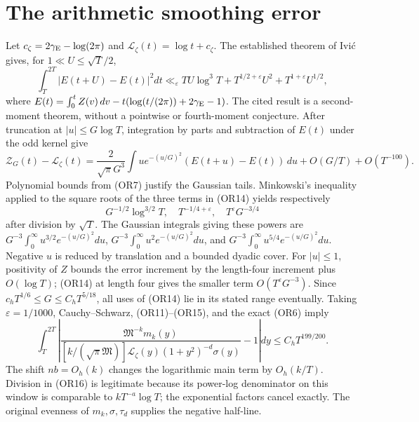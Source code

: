 \documentclass[11pt]{article}
\newcommand{\MM}{\mathfrak M}
\begin{document}
\section{The arithmetic smoothing error}
Let \(c_\zeta=2\gamma_{\rm E}-\log(2\pi)\) and
\(\mathcal L_\zeta(t)=\log t+c_\zeta\).  The established theorem
of Ivi\'c \cite[Section 2, (2.1) and its stated \(E\)-analogue]{Ivic}
gives, for \(1\ll U\leq\sqrt T/2\),
\[
 \int_T^{2T}|E(t+U)-E(t)|^2dt
 \ll_\varepsilon TU\log^3 T+
 T^{1/2+\varepsilon}U^2+T^{1+\varepsilon}U^{1/2},       \tag{OR14}
\]
where \(E(t)=\int_0^tZ(v)\,dv-t(\log(t/(2\pi))+2\gamma_{\rm E}-1)\).
The cited result is a second-moment theorem, without a pointwise or
fourth-moment conjecture.
After truncation at \(|u|\leq G\log T\), integration by parts and
subtraction of \(E(t)\) under the odd kernel give
\[
 \mathcal Z_G(t)-\mathcal L_\zeta(t)
 =\frac2{\sqrt\pi G^3}\int
 u e^{-(u/G)^2}(E(t+u)-E(t))\,du+O(G/T)+O(T^{-100}).
 \tag{OR15}
\]
Polynomial bounds from (OR7) justify the Gaussian tails.  Minkowski's
inequality applied to the square roots of the three terms in
(OR14) yields respectively
\[
 G^{-1/2}\log^{3/2}T,\quad
 T^{-1/4+\varepsilon},\quad T^\varepsilon G^{-3/4}
\]
after division by \(\sqrt T\).  The Gaussian integrals giving these
powers are \(G^{-3}\int_0^\infty u^{3/2}e^{-(u/G)^2}du\),
\(G^{-3}\int_0^\infty u^2e^{-(u/G)^2}du\), and
\(G^{-3}\int_0^\infty u^{5/4}e^{-(u/G)^2}du\).
Negative \(u\) is reduced by translation and a bounded dyadic cover.
For \(|u|\leq1\), positivity of \(Z\) bounds the error increment by
the length-four increment plus \(O(\log T)\); (OR14) at length four
gives the smaller term \(O(T^\varepsilon G^{-3})\).
Since
\(c_hT^{1/6}\leq G\leq C_hT^{5/18}\), all uses of (OR14) lie in
its stated range eventually.  Taking \(\varepsilon=1/1000\),
Cauchy--Schwarz, (OR11)--(OR15), and the exact (OR6) imply
\[
 \int_T^{2T}\left|
 \frac{\MM^{-k}m_k(y)}
 { [k/(\sqrt\pi\MM)]\mathcal L_\zeta(y)(1+y^2)^{-d}\sigma(y)}
 -1\right|dy\leq C_hT^{199/200}.                      \tag{OR16}
\]
The shift \(nb=O_h(k)\) changes the logarithmic main term by
\(O_h(k/T)\).  Division in (OR16) is legitimate because its
power-log denominator on this window is comparable to
\(kT^{-a}\log T\); the exponential factors cancel exactly.
The original evenness of \(m_k,\sigma,\tau_d\) supplies the negative
half-line.
\end{document}
